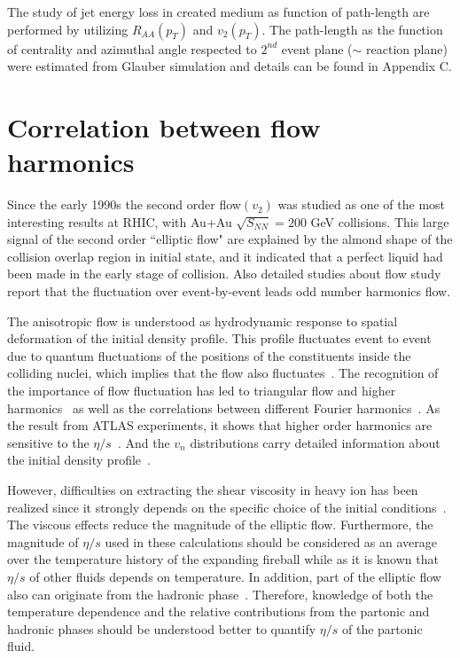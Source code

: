     The study of jet energy loss in created medium as function of path-length are performed by utilizing $R_{AA}(p_T)$ and $v_2(p_T)$.  The path-length as the function of centrality and azimuthal angle respected to $2^{nd}$ event plane ($\sim$ reaction plane) were estimated from Glauber simulation and details can be found in Appendix C.    
    
    
\clearpage
\section{Correlation between flow harmonics}

 Since the early 1990s the second order flow$(v_2)$ was studied as one of the most interesting results at RHIC, with Au+Au $\sqrt{S_{NN}}=200$ GeV collisions. This large signal of  the second order ``elliptic flow" are explained by the almond shape of the collision overlap region in initial state, and it indicated that a perfect liquid had been made in the early stage of collision. Also detailed studies about flow study report that the fluctuation over event-by-event leads odd number harmonics flow. 
 
 The anisotropic flow is understood as hydrodynamic response to spatial deformation of the initial density profile.
This profile fluctuates event to event due to quantum fluctuations of the positions of the constituents inside the colliding nuclei, which implies that the flow also fluctuates~\cite{Miller:2003kd,Alver:2006wh}.
The recognition of the importance of flow fluctuation has led to triangular flow and higher harmonics~\cite{Alver:2010gr,ALICE:2011ab} as well as the correlations between different Fourier harmonics~\cite{Aad:2014fla}.
 As the result from ATLAS experiments, it shows that higher order harmonics are sensitive to the $\eta/s$~\cite{Luzum:2012wu}.
And the $v_{n}$ distributions carry detailed information about the initial density profile~\cite{Renk:2014jja,Yan:2014nsa}.

However, difficulties on extracting the shear viscosity in heavy ion has been realized since it strongly depends on the specific choice of the initial conditions~\cite{Romatschke:2007mq,Luzum:2012wu,Shen:2011zc}.
The viscous effects reduce the magnitude of the elliptic flow. Furthermore, the magnitude of $\eta/s$ used in these calculations should be considered as an average over the temperature history of the expanding fireball while as it is known that $\eta/s$ of other fluids depends on temperature. 
In addition, part of the elliptic flow also can originate from the hadronic phase~\cite{Bozek:2011ua,Rose:2014fba,Ryu:2015vwa}. Therefore,
knowledge of both the temperature dependence and the relative contributions from the partonic and hadronic phases should be understood better to quantify $\eta/s$ of the partonic fluid.

